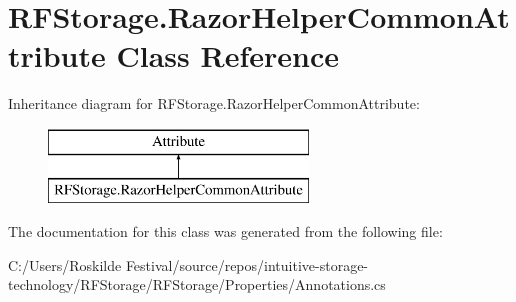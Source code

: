 \hypertarget{class_r_f_storage_1_1_razor_helper_common_attribute}{}\section{R\+F\+Storage.\+Razor\+Helper\+Common\+Attribute Class Reference}
\label{class_r_f_storage_1_1_razor_helper_common_attribute}
Inheritance diagram for R\+F\+Storage.\+Razor\+Helper\+Common\+Attribute\+:\begin{figure}[H]
\begin{center}
\leavevmode
\includegraphics[height=2.000000cm]{class_r_f_storage_1_1_razor_helper_common_attribute}
\end{center}
\end{figure}


The documentation for this class was generated from the following file\+:\begin{DoxyCompactItemize}
\item 
C\+:/\+Users/\+Roskilde Festival/source/repos/intuitive-\/storage-\/technology/\+R\+F\+Storage/\+R\+F\+Storage/\+Properties/Annotations.\+cs\end{DoxyCompactItemize}
